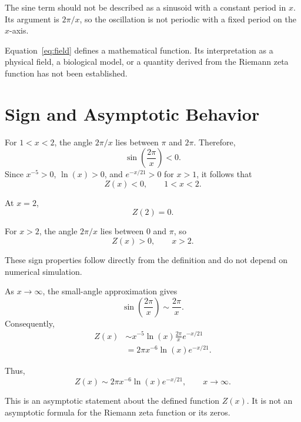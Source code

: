 \documentclass[11pt,a4paper]{article}
\begin{document}
The sine term should not be described as a sinusoid with a
constant period in \(x\). Its argument is \(2\pi/x\), so the
oscillation is not periodic with a fixed period on the
\(x\)-axis.

Equation~\eqref{eq:field} defines a mathematical function.
Its interpretation as a physical field, a biological model,
or a quantity derived from the Riemann zeta function has not
been established.

\section{Sign and Asymptotic Behavior}

For \(1<x<2\), the angle \(2\pi/x\) lies between \(\pi\) and
\(2\pi\). Therefore,
\[
\sin\left(\frac{2\pi}{x}\right)<0.
\]
Since \(x^{-5}>0\), \(\ln(x)>0\), and \(e^{-x/21}>0\) for \(x>1\),
it follows that
\begin{equation}
Z(x)<0,\qquad 1<x<2.
\label{eq:negative}
\end{equation}

At \(x=2\),
\begin{equation}
Z(2)=0.
\label{eq:zero2}
\end{equation}

For \(x>2\), the angle \(2\pi/x\) lies between \(0\) and \(\pi\),
so
\begin{equation}
Z(x)>0,\qquad x>2.
\label{eq:positive}
\end{equation}

These sign properties follow directly from the definition
and do not depend on numerical simulation.

As \(x\to\infty\), the small-angle approximation gives
\[
\sin\left(\frac{2\pi}{x}\right)
\sim\frac{2\pi}{x}.
\]
Consequently,
\begin{align}
Z(x)
&\sim x^{-5}\ln(x)\frac{2\pi}{x}e^{-x/21}\\
&=2\pi x^{-6}\ln(x)e^{-x/21}.
\end{align}

Thus,
\begin{equation}
Z(x)\sim
2\pi x^{-6}\ln(x)e^{-x/21},
\qquad x\to\infty.
\label{eq:asymptotic}
\end{equation}

This is an asymptotic statement about the defined function
\(Z(x)\). It is not an asymptotic formula for the Riemann
zeta function or its zeros.
\end{document}
